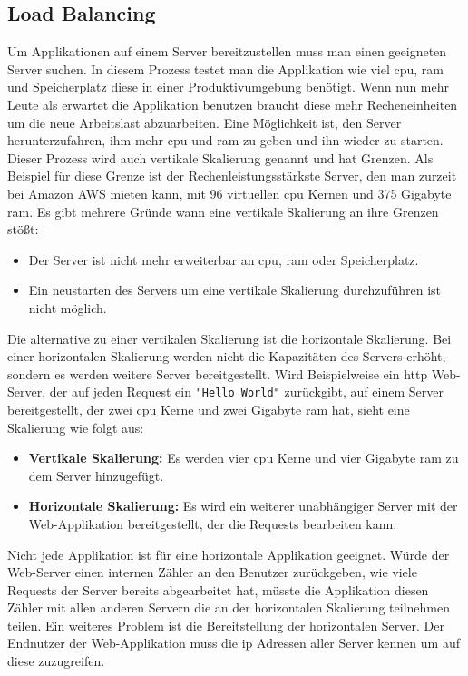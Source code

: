 \subsection{Load Balancing} \label{s:load-balancing}
Um Applikationen auf einem Server bereitzustellen muss man einen geeigneten Server suchen. In diesem Prozess testet man die Applikation wie viel \acs{cpu}, \acs{ram} und Speicherplatz diese in einer Produktivumgebung benötigt. Wenn nun mehr Leute als erwartet die Applikation benutzen braucht diese mehr Recheneinheiten um die neue Arbeitslast abzuarbeiten. Eine Möglichkeit ist, den Server herunterzufahren, ihm mehr \acs{cpu} und \acs{ram} zu geben und ihn wieder zu starten. Dieser Prozess wird auch vertikale Skalierung genannt und hat Grenzen.\cite{bourkeServerLoadBalancing2001}
Als Beispiel für diese Grenze ist der Rechenleistungsstärkste Server, den man zurzeit bei Amazon AWS mieten kann, mit 96 virtuellen \acs{cpu} Kernen und 375 Gigabyte \acs{ram}.\cite{EC2OnDemandInstance}
Es gibt mehrere Gründe wann eine vertikale Skalierung an ihre Grenzen stö{\ss}t:
\begin{itemize}
    \item Der Server ist nicht mehr erweiterbar an \acs{cpu}, \acs{ram} oder Speicherplatz.
    \item Ein neustarten des Servers um eine vertikale Skalierung durchzuführen ist nicht möglich.
\end{itemize}
\cite{bourkeServerLoadBalancing2001}
Die alternative zu einer vertikalen Skalierung ist die horizontale Skalierung. Bei einer horizontalen Skalierung werden nicht die Kapazitäten des Servers erhöht, sondern es werden weitere Server bereitgestellt.
Wird Beispielweise ein \acs{http} Web-Server, der auf jeden Request ein \verb|"Hello World"| zurückgibt, auf einem Server bereitgestellt, der zwei \ac{cpu} Kerne und zwei Gigabyte \ac{ram} hat, sieht eine Skalierung wie folgt aus:
\begin{itemize}
    \item \textbf{Vertikale Skalierung:} Es werden vier \ac{cpu} Kerne und vier Gigabyte \ac{ram} zu dem Server hinzugefügt.
    \item \textbf{Horizontale Skalierung:} Es wird ein weiterer unabhängiger Server mit der Web-Applikation bereitgestellt, der die Requests bearbeiten kann.
\end{itemize}
Nicht jede Applikation ist für eine horizontale Applikation geeignet. Würde der Web-Server einen internen Zähler an den Benutzer zurückgeben, wie viele Requests der Server bereits abgearbeitet hat, müsste die Applikation diesen Zähler mit allen anderen Servern die an der horizontalen Skalierung teilnehmen teilen.
Ein weiteres Problem ist die Bereitstellung der horizontalen Server. Der Endnutzer der Web-Applikation muss die \ac{ip} Adressen aller Server kennen um auf diese zuzugreifen.

